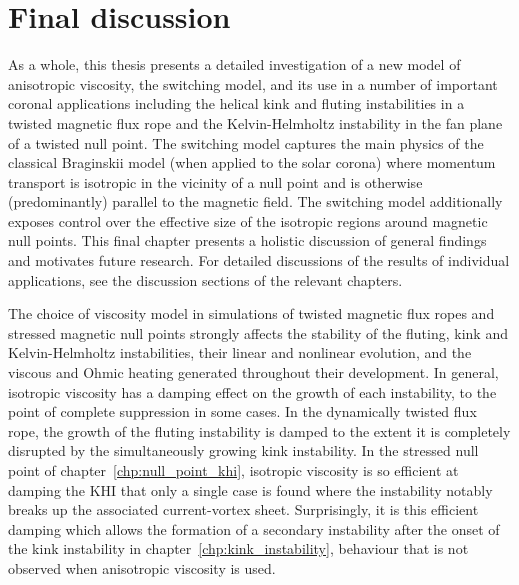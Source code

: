 \chapter{Final discussion}

\label{chp:summary}

As a whole, this thesis presents a detailed investigation of a new model of anisotropic viscosity, the switching model, and its use in a number of important coronal applications including the helical kink and fluting instabilities in a twisted magnetic flux rope and the Kelvin-Helmholtz instability in the fan plane of a twisted null point. The switching model captures the main physics of the classical Braginskii model (when applied to the solar corona) where momentum transport is isotropic in the vicinity of a null point and is otherwise (predominantly) parallel to the magnetic field. The switching model additionally exposes control over the effective size of the isotropic regions around magnetic null points. This final chapter presents a holistic discussion of general findings and motivates future research. For detailed discussions of the results of individual applications, see the discussion sections of the relevant chapters.

The choice of viscosity model in simulations of twisted magnetic flux ropes and stressed magnetic null points strongly affects the stability of the fluting, kink and Kelvin-Helmholtz instabilities, their linear and nonlinear evolution, and the viscous and Ohmic heating generated throughout their development. In general, isotropic viscosity has a damping effect on the growth of each instability, to the point of complete suppression in some cases. In the dynamically twisted flux rope, the growth of the fluting instability is damped to the extent it is completely disrupted by the simultaneously growing kink instability. In the stressed null point of chapter~\ref{chp:null_point_khi}, isotropic viscosity is so efficient at damping the KHI that only a single case is found where the instability notably breaks up the associated current-vortex sheet. Surprisingly, it is this efficient damping which allows the formation of a secondary instability after the onset of the kink instability in chapter~\ref{chp:kink_instability}, behaviour that is not observed when anisotropic viscosity is used.

